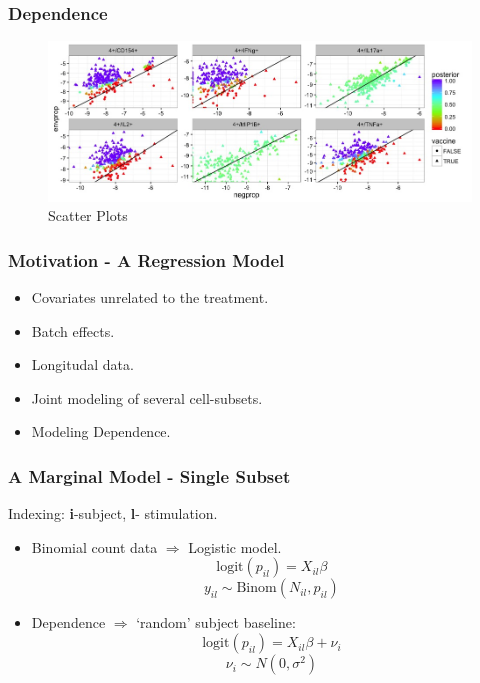 \documentclass{beamer}
\theoremstyle{definition}
\begin{document}
\begin{frame}
\frametitle{Dependence} 
\begin{center}
\begin{figure}[]
\includegraphics[width=12 cm]{figures/marginalbinomscatter} \caption{Scatter Plots}
\end{figure}
\end{center}
\end{frame}


\begin{frame}
\frametitle{Motivation - A Regression Model }
\begin{itemize}
	\item Covariates unrelated to the treatment.
	\vspace{0.3 cm}
	\item Batch effects. 
\vspace{0.3 cm}
\item Longitudal data.
\vspace{0.3 cm}
\item Joint modeling of several cell-subsets.
\vspace{0.3 cm}
\item Modeling Dependence.
\end{itemize}
\end{frame}


\begin{frame}
\frametitle{A Marginal Model - Single Subset}
\begin{framed}
Indexing: \textbf{i}-subject, \textbf{l}- stimulation.
\end{framed}

\begin{itemize}
\item Binomial count data $\Rightarrow$ Logistic model.
$$
\text{logit}(p_{il}) = X_{il} \beta
$$$$
y_{il} \sim \text{Binom}(N_{il}, p_{il})
$$

\pause
\item Dependence $\Rightarrow$ `random' subject baseline:
$$
\text{logit}(p_{il}) = X_{il} \beta + \nu_i
$$$$
\nu_i \sim N(0, \sigma^{2})
$$
\end{itemize}
\end{frame}
\end{document}
